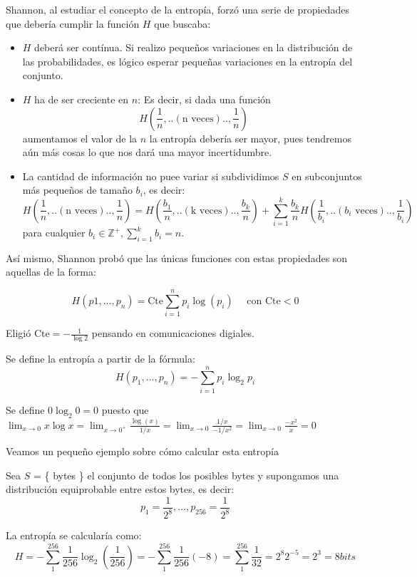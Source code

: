 	Shannon, al estudiar el concepto de la entropía, forzó una serie de propiedades que debería cumplir la función $H$ que buscaba:
	\begin{itemize}
		\item $H$ deberá ser contínua. Si realizo pequeños variaciones en la distribución de las probabilidades, es lógico esperar pequeñas variaciones en la entropía del conjunto.

		\item $H$ ha de ser creciente en $n$: Es decir, si dada una función
		\[H\left(\frac{1}{n},..(\text{n veces})..,\frac{1}{n}\right)  \]
		 aumentamos el valor de la $n$ la entropía debería ser mayor, pues tendremos aún más cosas lo que nos dará una mayor incertidumbre.
		\item La cantidad de información no puee variar si subdividimos $S$ en subconjuntos más pequeños de tamaño $b_i$, es decir:
		\[H\left(\frac{1}{n},..(\text{n veces})..,\frac{1}{n}\right) =  H\left(\frac{b_1}{n},..(\text{k veces})..,\frac{b_k}{n}\right) + \sum^{k}_{i = 1} \frac{b_k}{n} H\left(\frac{1}{b_i},..(b_i \text{ veces})..,\frac{1}{b_i}\right) \] para cualquier $b_i \in \mathbb{Z}^+, \sum^{k}_{i = 1} b_i = n$.
	\end{itemize}


	Así mismo, Shannon probó que las únicas funciones con estas propiedades son aquellas de la forma:

	$$H(p1, ..., p_n) = \text{Cte} \sum^{n}_{i=1} p_i \log(p_i) \quad \text{ con } \text{Cte} < 0 $$

	Eligió $\text{Cte} = -\frac{1}{\log 2}$ pensando en comunicaciones digiales.

	\begin{defn}[Entropia]
		Se define la entropía a partir de la fórmula:
		$$H(p_1, ..., p_n) = -\sum^{n}_{i = 1} p_i \log_2 p_i $$

		Se define $0 \log_2 0 = 0$ puesto que $\lim_{x \rightarrow 0} x \log x = \lim_{x \rightarrow 0^+} \frac{\log(x)}{1/x} = \lim_{x \rightarrow 0} \frac{1/x}{-1 / x^2} = \lim_{x \rightarrow 0} \frac{-x^2}{x} = 0$
	\end{defn}

	Veamos un pequeño ejemplo sobre cómo calcular esta entropía

	\begin{example}

		Sea $S$ = \{ bytes \} el conjunto de todos los posibles bytes y supongamos una distribución equiprobable entre estos bytes, es decir:
		\[p_1 = \frac{1}{2^8}, ..., p_{256} = \frac{1}{2^8}\]

		La entropía se calcularía como:
		$$  H = - \sum_{1}^{256} \frac{1}{256} \log_2 (\frac{1}{256}) = - \sum_{1}^{256} \frac{1}{256} (-8) = \sum_{1}^{256} \frac{1}{32} = 2^8 2^{-5} = 2^3 = 8 bits$$

	\end{example}

